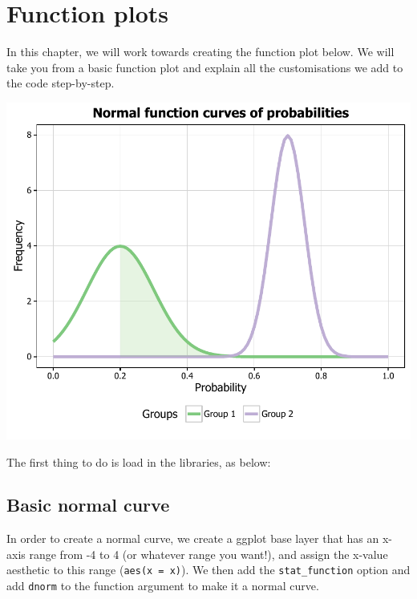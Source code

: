 \chapter{Function plots}

In this chapter, we will work towards creating the function plot below.
We will take you from a basic function plot and explain all the
customisations we add to the code step-by-step.

\begin{center}\includegraphics[width=0.6\linewidth]{9_Function_Plots_pdf/function_final-1} \end{center}

The first thing to do is load in the libraries, as below:

\begin{Shaded}
\begin{Highlighting}[]
\end{Highlighting}
\end{Shaded}

\section{Basic normal curve}\label{basic-normal-curve}

In order to create a normal curve, we create a ggplot base layer that
has an x-axis range from -4 to 4 (or whatever range you want!), and
assign the x-value aesthetic to this range (\texttt{aes(x\ =\ x)}). We
then add the \texttt{stat\_function} option and add \texttt{dnorm} to
the function argument to make it a normal curve.

\begin{Shaded}
\begin{Highlighting}[]
\StringTok{ }\NormalTok{(}\NormalTok{(} \NormalTok{(-}\NormalTok{, }\NormalTok{)), }\NormalTok{(} 
\StringTok{  }\NormalTok{(} 
\end{Highlighting}
\end{Shaded}

